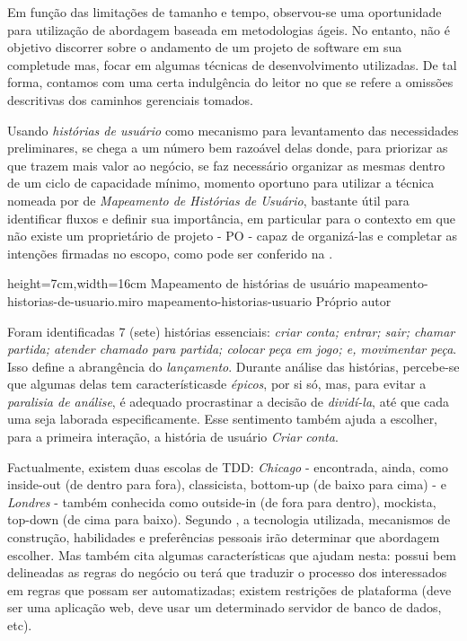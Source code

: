   Em função das limitações de tamanho e tempo, observou-se uma oportunidade para utilização de abordagem baseada em metodologias ágeis. No entanto, não é objetivo discorrer sobre o andamento de um projeto de software em sua completude mas, focar em algumas técnicas de desenvolvimento utilizadas. De tal forma, contamos com uma certa indulgência do leitor no que se refere a omissões descritivas dos caminhos gerenciais tomados.

  Usando \emph{histórias de usuário} como mecanismo para levantamento das necessidades preliminares, se chega a um número bem razoável delas donde, para priorizar as que trazem mais valor ao negócio, se faz necessário organizar as mesmas dentro de um ciclo de capacidade mínimo, momento oportuno para utilizar a técnica nomeada por  de \emph{Mapeamento de Histórias de Usuário}, bastante útil para identificar fluxos e definir sua importância, em particular para o contexto em que não existe um proprietário de projeto - PO - capaz de organizá-las e completar as intenções firmadas no escopo, como pode ser conferido na .

  \imagem
    {height=7cm,width=16cm}
    {Mapeamento de histórias de usuário}
    {mapeamento-historias-de-usuario.miro}
    {mapeamento-historias-usuario}
    {Próprio autor\footnotemark}

  Foram identificadas 7 (sete) histórias essenciais: \emph{criar conta; entrar; sair; chamar partida; atender chamado para partida; colocar peça em jogo; e, movimentar peça}. Isso define a abrangência do \emph{lançamento}\cite[tradução nossa]{Beck2001}. Durante análise das histórias, percebe-se que algumas delas tem característicasde \emph{épicos}\cite[pág. 6, tradução nossa]{Cohn2004}, por si só, mas, para evitar a \emph{paralisia de análise}\cite[pág. 71, tradução nossa]{Pugh2011}, é adequado procrastinar a decisão de \emph{dividí-la}\cite[pág. 24, tradução nossa]{Cohn2004}, até que cada uma seja laborada especificamente. Esse sentimento também ajuda a escolher, para a primeira interação, a história de usuário \emph{Criar conta}.

  Factualmente, existem duas escolas de TDD: \emph{Chicago} - encontrada, ainda, como inside-out (de dentro para fora), classicista, bottom-up (de baixo para cima) - e \emph{Londres} - também conhecida como outside-in (de fora para dentro), mockista, top-down (de cima para baixo). Segundo , a tecnologia utilizada, mecanismos de construção, habilidades e preferências pessoais irão determinar que abordagem escolher. Mas também cita algumas características que ajudam nesta: possui bem delineadas as regras do negócio ou terá que traduzir o processo dos interessados em regras que possam ser automatizadas; existem restrições de plataforma (deve ser uma aplicação web, deve usar um determinado servidor de banco de dados, etc).

